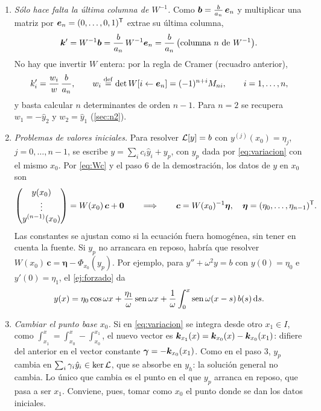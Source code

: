 \begin{observacion}\label{obs:variacion}
\leavevmode
\begin{enumerate}[label=(\roman*), itemsep=4pt]
  \item \emph{Sólo hace falta la última columna de $W^{-1}$.} Como
        $\bm{b}=\frac{b}{a_n}\,\bm{e}_n$ y multiplicar una matriz por
        $\bm{e}_n=(0,\dots,0,1)^{\mathsf{T}}$ extrae su última columna,
        \[
          \bm{k}'=W^{-1}\bm{b}=\frac{b}{a_n}\,W^{-1}\bm{e}_n
          =\frac{b}{a_n}\,\bigl(\text{columna $n$ de }W^{-1}\bigr).
        \]
        No hay que invertir $W$ entera: por la regla de Cramer (recuadro
        anterior),
        \begin{equation}\label{eq:cramer}
          k_i'=\frac{w_i}{w}\,\frac{b}{a_n},\qquad
          w_i\mathrel{\overset{\mathrm{def}}{=}}\det W[i\leftarrow\bm{e}_n]=(-1)^{n+i}M_{ni},\qquad i=1,\dots,n,
        \end{equation}
        y basta calcular $n$ determinantes de orden $n-1$. Para $n=2$ se
        recupera $w_1=-\hat y_2$ y $w_2=\hat y_1$ (\cref{sec:n2}).
  \item \emph{Problemas de valores iniciales.} Para resolver $\mathcal{L}[y]=b$ con
        $y^{(j)}(x_0)=\eta_j$, $j=0,\dots,n-1$, se escribe
        $y=\sum_ic_i\hat y_i+y_p$, con $y_p$ dada por \eqref{eq:variacion}
        con el mismo $x_0$. Por \eqref{eq:Wc} y el paso 6 de la
        demostración, los datos de $y$ en $x_0$ son
        \[
          \begin{pmatrix}y(x_0)\\ \vdots\\ y^{(n-1)}(x_0)\end{pmatrix}
          =W(x_0)\,\bm c+\bm 0
          \qquad\Longrightarrow\qquad
          \bm c=W(x_0)^{-1}\bm\eta,\quad \bm\eta=(\eta_0,\dots,\eta_{n-1})^{\mathsf{T}}.
        \]
        Las constantes se ajustan como si la ecuación fuera homogénea, sin
        tener en cuenta la fuente. Si $y_p$ no arrancara en reposo, habría
        que resolver $W(x_0)\,\bm c=\bm\eta-\Phi_{x_0}(y_p)$. Por ejemplo, para
        $y''+\omega^{2}y=b$ con $y(0)=\eta_0$ e $y'(0)=\eta_1$, el
        \cref{ej:forzado} da
        \[
          y(x)=\eta_0\cos\omega x+\frac{\eta_1}{\omega}\operatorname{sen}\omega x
          +\frac1\omega\int_{0}^{x}\operatorname{sen}\omega(x-s)\,b(s)\,\mathrm{d} s .
        \]
  \item \emph{Cambiar el punto base $x_0$.} Si en \eqref{eq:variacion} se
        integra desde otro $x_1\in I$, como
        $\int_{x_1}^{x}=\int_{x_0}^{x}-\int_{x_0}^{x_1}$, el nuevo vector es
        $\bm{k}_{x_1}(x)=\bm{k}_{x_0}(x)-\bm{k}_{x_0}(x_1)$: difiere del anterior en
        el vector constante $\bm\gamma=-\bm{k}_{x_0}(x_1)$. Como en el paso 3,
        $y_p$ cambia en $\sum_i\gamma_i\hat y_i\in\operatorname{ker}\mathcal{L}$, que se absorbe en
        $y_h$: la solución general no cambia. Lo único que cambia es el
        punto en el que $y_p$ arranca en reposo, que pasa a ser $x_1$.
        Conviene, pues, tomar como $x_0$ el punto donde se dan los datos
        iniciales.
\end{enumerate}
\end{observacion}

